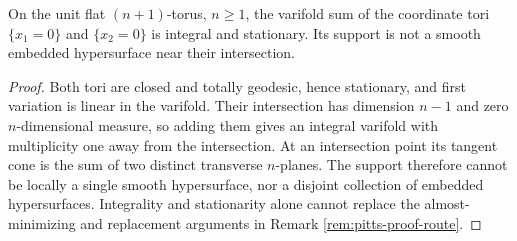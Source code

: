 \begin{example}\label{ex:crossing-stationary-tori}
On the unit flat $(n+1)$-torus, $n\geq1$, the varifold sum of the coordinate tori $\{x_1=0\}$ and $\{x_2=0\}$ is integral and stationary. Its support is not a smooth embedded hypersurface near their intersection.
\end{example}
\begin{proof}
Both tori are closed and totally geodesic, hence stationary, and first variation is linear in the varifold. Their intersection has dimension $n-1$ and zero $n$-dimensional measure, so adding them gives an integral varifold with multiplicity one away from the intersection. At an intersection point its tangent cone is the sum of two distinct transverse $n$-planes. The support therefore cannot be locally a single smooth hypersurface, nor a disjoint collection of embedded hypersurfaces. Integrality and stationarity alone cannot replace the almost-minimizing and replacement arguments in Remark \ref{rem:pitts-proof-route}.
\end{proof}
